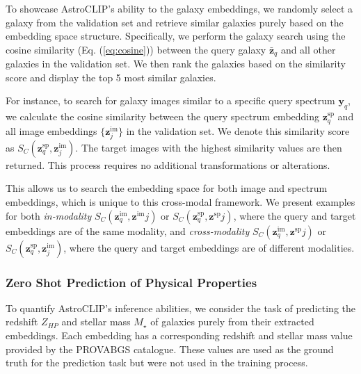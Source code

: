 \documentclass[a4paper,12pt]{article}
\begin{document}
To showcase AstroCLIP's ability to the galaxy embeddings, we randomly select a galaxy from the validation set and retrieve similar galaxies purely based on the embedding space structure. Specifically, we perform the galaxy search using the cosine similarity (Eq. (\ref{eq:cosine})) between the query galaxy $\bar{\mathbf{z}}_q$ and all other galaxies in the validation set. We then rank the galaxies based on the similarity score and display the top 5 most similar galaxies.

For instance, to search for galaxy images similar to a specific query spectrum $\mathbf{y}_q$, we calculate the cosine similarity between the query spectrum embedding $\mathbf{z}^{\text{sp}}_q$ and all image embeddings $\{ \mathbf{z}^{\text{im}}_j \}$ in the validation set. We denote this similarity score as $S_C(\mathbf{z}^{\text{sp}}_q, \mathbf{z}^{\text{im}}_j)$. The target images with the highest similarity values are then returned. This process requires no additional transformations or alterations.

This allows us to search the embedding space for both image and spectrum embeddings, which is unique to this cross-modal framework. We present examples for both \emph{in-modality} $S_{C}(\mathbf{z}^{\text{im}}_q, \mathbf{z}^{\text{im}}j)$ or $S_{C}(\mathbf{z}^{\text{sp}}_q, \mathbf{z}^{\text{sp}}j)$, where the query and target embeddings are of the same modality, and \emph{cross-modality} $S_{C}(\mathbf{z}^{\text{im}}_q, \mathbf{z}^{\text{sp}}j)$ or $S_{C}(\mathbf{z}^{\text{sp}}_q, \mathbf{z}^{\text{im}}_j)$, where the query and target embeddings are of different modalities.





\subsubsection{Zero Shot Prediction of Physical Properties}
To quantify AstroCLIP's inference abilities, we consider the task of predicting the redshift $Z_{HP}$ and stellar mass $M_{\star}$ of galaxies purely from their extracted embeddings. Each embedding has a corresponding redshift and stellar mass value provided by the PROVABGS catalogue. These values are used as the ground truth for the prediction task but were not used in the training process.
\end{document}
